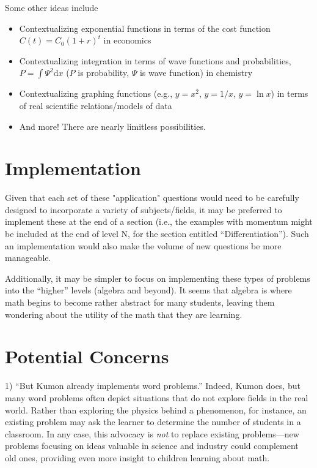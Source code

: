 \documentclass[fleqn]{article}
\begin{document}
Some other ideas include 
\begin{itemize}
	\item Contextualizing exponential functions in terms of the cost function $C(t)=C_0 (1+r)^t$ in economics 
	\item Contextualizing integration in terms of wave functions and probabilities, $P=\int \Psi^2 \mathrm{d}x$ ($P$ is probability, $\Psi$ is wave function) in chemistry
	\item Contextualizing graphing functions (e.g., $y=x^2$, $y=1/x$, $y=\ln{x}$) in terms of real scientific relations/models of data 
	\item And more! There are nearly limitless possibilities.
\end{itemize}


\section{Implementation}
Given that each set of these "application" questions would need to be carefully designed to incorporate a variety of subjects/fields, it may be preferred to implement these at the end of a section (i.e., the examples with momentum might be included at the end of level N, for the section entitled ``Differentiation''). Such an implementation would also make the volume of new questions be more manageable. \bigskip 

Additionally, it may be simpler to focus on implementing these types of problems into the ``higher'' levels (algebra and beyond). It seems that algebra is where math begins to become rather abstract for many students, leaving them wondering about the utility of the math that they are learning. 

\section{Potential Concerns}

1) ``But Kumon already implements word problems.'' Indeed, Kumon does, but many word problems often depict situations that do not explore fields in the real world. Rather than exploring the physics behind a phenomenon, for instance, an existing problem may ask the learner to determine the number of students in a classroom. In any case, this advocacy is \textit{not} to replace existing problems---new problems focusing on ideas valuable in science and industry could complement old ones, providing even more insight to children learning about math. \bigskip
\end{document}
